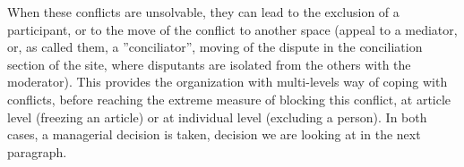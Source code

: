 When these conflicts are unsolvable, they can lead to the exclusion
of a participant, or to the move of the conflict to another space
(appeal to a mediator, or, as \citet{BillingsWatts10} called them,
a ''conciliator'', moving of the dispute in the conciliation section
of the site, where disputants are isolated from the others with the
moderator). This provides the organization with multi-levels way of
coping with conflicts, before reaching the extreme measure of blocking
this conflict, at article level (freezing an article) or at individual
level (excluding a person). In both cases, a managerial decision is
taken, decision we are looking at in the next paragraph.